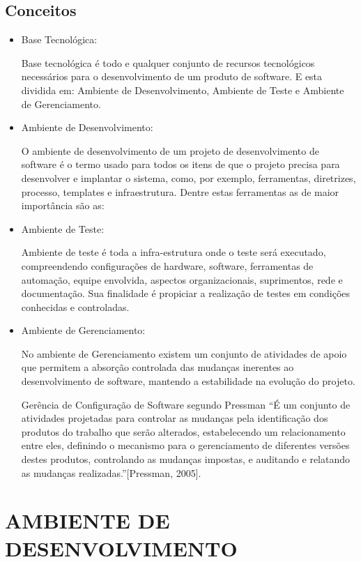 \documentclass[12pt,a4paper]{article}
\begin{document}
	\subsection{Conceitos}
	
	\begin{itemize}
	\item Base Tecnológica: 
	
	Base tecnológica é todo e qualquer conjunto de recursos tecnológicos necessários para o desenvolvimento de um produto de software. E esta dividida em: Ambiente de Desenvolvimento, Ambiente de Teste e Ambiente de Gerenciamento.
	\item Ambiente de Desenvolvimento:
	
	 O ambiente de desenvolvimento de um projeto de desenvolvimento de software é o termo usado para todos os itens de que o projeto precisa para desenvolver e implantar o sistema, como, por exemplo, ferramentas, diretrizes, processo, templates e infraestrutura. Dentre estas ferramentas as de maior importância são as:
	\item Ambiente de Teste: 
	
	Ambiente de teste é toda a infra-estrutura onde o teste será executado, compreendendo configurações de hardware, software, ferramentas de automação, equipe envolvida, aspectos organizacionais, suprimentos, rede e documentação. Sua finalidade é propiciar a realização de testes em condições conhecidas e controladas.
	\item Ambiente de Gerenciamento:
	
	 No ambiente de Gerenciamento existem um conjunto de atividades de apoio que permitem a absorção controlada das mudanças inerentes ao desenvolvimento de software, mantendo a estabilidade na evolução do projeto.
	
	Gerência de Configuração de Software segundo Pressman “É um conjunto de atividades projetadas para controlar as mudanças pela identificação dos produtos do trabalho que serão alterados, estabelecendo um relacionamento entre eles, definindo o mecanismo para o gerenciamento de diferentes versões destes produtos, controlando as mudanças impostas, e auditando e relatando as mudanças realizadas.”[Pressman, 2005].
	\end{itemize}
	

\clearpage
\section{AMBIENTE DE DESENVOLVIMENTO}
\end{document}

